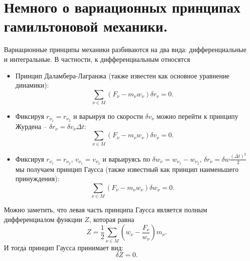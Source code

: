 \section{Немного о вариационных принципах гамильтоновой механики.}
Вариационные принципы механики разбиваются на два вида: дифференциальные и интегральные.
В частности, к дифференциальным относятся
\begin{itemize}
    \item Принцип Даламбера-Лагранжа (также известен как основное уравнение динамики):
    \[
        \sum\limits_{\nu \in M} (F_\nu - m_\nu w_\nu)\delta r_\nu = 0.
    \]
    \item Фиксируя $r_{\nu_1} = r_{\nu_2}$ и варьируя по скорости $\delta v_\nu$ можно перейти к принципу Журдена -- $\delta r_\nu = \delta v_\nu \Delta t$:
    \[
        \sum\limits_{\nu \in M} (F_\nu - m_\nu w_\nu) \delta v_{\nu} = 0.
    \]
    \item Фиксируя $r_{\nu_1} = r_{\nu_2}$, $v_{\nu_1} = v_{\nu_2}$ и варьируясь по $\delta w_{\nu} = w_{\nu_1} - w_{\nu_2}$, $\delta r_{\nu} = \delta w \frac{(\Delta t)^2}{2}$ мы получаем принцип Гаусса (также известный как принцип наименьшего принуждения):
    \[
        \sum\limits_{\nu \in M} (F_\nu - m_\nu w_\nu) \delta w_{\nu} = 0.
    \]
\end{itemize}
Можно заметить, что левая часть принципа Гаусса является полным дифференциалом функции $Z$, которая равна
\[
    Z = \dfrac{1}{2}\sum\limits_{\nu \in M}(w_\nu - \dfrac{F_\nu}{w_\nu})m_{\nu}.
\]
И тогда принцип Гаусса принимает вид:
\[
    \delta Z = 0.
\]
